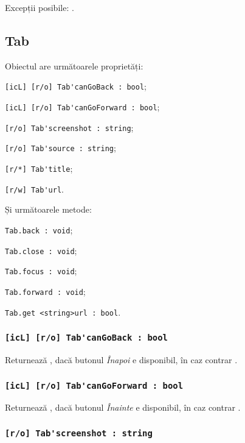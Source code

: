 Excepții posibile: .

\subsection{{\color{orange} Tab}}

Obiectul \tab{} are următoarele proprietăți:
\begin{icItems}
	\item \lstinline|[icL] [r/o] Tab'canGoBack : bool|;
	\item \lstinline|[icL] [r/o] Tab'canGoForward : bool|;
	\item \lstinline|[r/o] Tab'screenshot : string|;
	\item \lstinline|[r/o] Tab'source : string|;
	\item \lstinline|[r/*] Tab'title|;
	\item \lstinline|[r/w] Tab'url|.
\end{icItems}

Și următoarele metode:
\begin{icItems}
	\item \lstinline|Tab.back : void|;
	\item \lstinline|Tab.close : void|;
	\item \lstinline|Tab.focus : void|;
	\item \lstinline|Tab.forward : void|;
	\item \lstinline|Tab.get <string>url : bool|.
\end{icItems}

\subsubsection{\lstinline|[icL] [r/o] Tab'canGoBack : bool|}

Returnează \true, dacă butonul \textit{Înapoi} e disponibil, în caz contrar \false.

\subsubsection{\lstinline|[icL] [r/o] Tab'canGoForward : bool|}

Returnează \true, dacă butonul \textit{Înainte} e disponibil, în caz contrar \false.

\subsubsection{\lstinline|[r/o] Tab'screenshot : string|}

